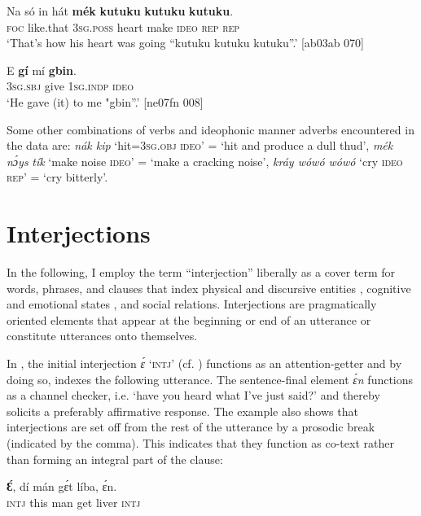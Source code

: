 \ea%
    \label{ex:key:1633}
    \gll Na  só    in    hát    \textbf{mék}    \textbf{kutuku}  \textbf{kutuku}  \textbf{kutuku}.\\
\textsc{foc}  like.that  \textsc{3sg.poss}  heart  make  \textsc{ideo}    \textsc{rep}    \textsc{rep}\\

\glt ‘That’s how his heart was going “kutuku kutuku kutuku”.’ [ab03ab 070]
\z


\ea%
    \label{ex:key:1634}
    \gll E    \textbf{gí}  mí    \textbf{gbin}.\\
\textsc{3sg.sbj}  give  \textsc{1sg.indp}  \textsc{ideo}\\

\glt ‘He gave (it) to me "gbin”.’ [ne07fn 008]
\z

Some other combinations of verbs and ideophonic manner adverbs encountered in the data are: \textit{nák kip} ‘hit=\textsc{3sg.obj} \textsc{ideo’} = ‘hit and produce a dull thud’, \textit{mék nɔ́ys} \textit{tík} ‘make noise \textsc{ideo}’ = ‘make a cracking noise’, \textit{kráy wówó wówó} ‘cry \textsc{ideo} \textsc{rep’} = ‘cry bitterly’.

\section{Interjections}\label{sec:12.2}

In the following, I employ the term “interjection” liberally as a cover term for words, phrases, and clauses that index physical and discursive entities \citep{Kockelman2003}, cognitive and emotional states \citep{Ameka1992a}, and social relations. Interjections are pragmatically oriented elements that appear at the beginning or end of an utterance or constitute utterances onto themselves.


In , the initial interjection \textit{ɛ́} ‘\textsc{intj}’ (cf. ) functions as an attention-getter and by doing so, indexes the following utterance. The sentence-final element \textit{ɛ́n} functions as a channel checker, i.e. ‘have you heard what I’ve just said?’ and thereby solicits a preferably affirmative response. The example also shows that interjections are set off from the rest of the utterance by a prosodic break (indicated by the comma). This indicates that they function as co-text rather than forming an integral part of the clause:



\ea%
    \label{ex:key:1635}
    \gll \textbf{Ɛ́},  dí  mán    gɛ́t  líba,    ɛ́n.\\
\textsc{intj}  this  man    get  liver  \textsc{intj}\\

